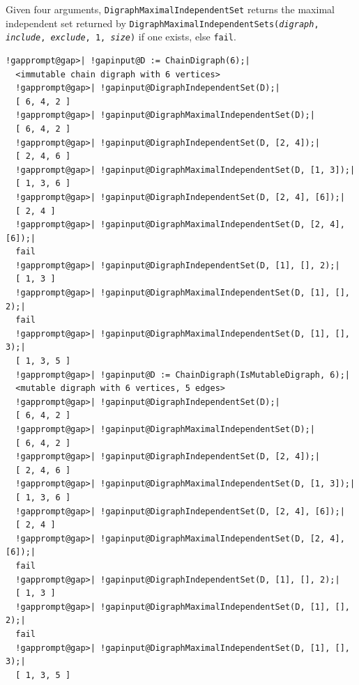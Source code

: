 \documentclass[a4paper,11pt]{report}
\begin{document}
{{{\begin{description}
 Given four arguments, \texttt{DigraphMaximalIndependentSet} returns the maximal independent set returned by \texttt{DigraphMaximalIndependentSets(}\mbox{\texttt{\mdseries\slshape digraph}}\texttt{, }\mbox{\texttt{\mdseries\slshape include}}\texttt{, }\mbox{\texttt{\mdseries\slshape exclude}}\texttt{, 1, }\mbox{\texttt{\mdseries\slshape size}}\texttt{)} if one exists, else \texttt{fail}. 
\end{description}
 
\begin{Verbatim}[commandchars=!@|,fontsize=\small,frame=single,label=Example]
  !gapprompt@gap>| !gapinput@D := ChainDigraph(6);|
  <immutable chain digraph with 6 vertices>
  !gapprompt@gap>| !gapinput@DigraphIndependentSet(D);|
  [ 6, 4, 2 ]
  !gapprompt@gap>| !gapinput@DigraphMaximalIndependentSet(D);|
  [ 6, 4, 2 ]
  !gapprompt@gap>| !gapinput@DigraphIndependentSet(D, [2, 4]);|
  [ 2, 4, 6 ]
  !gapprompt@gap>| !gapinput@DigraphMaximalIndependentSet(D, [1, 3]);|
  [ 1, 3, 6 ]
  !gapprompt@gap>| !gapinput@DigraphIndependentSet(D, [2, 4], [6]);|
  [ 2, 4 ]
  !gapprompt@gap>| !gapinput@DigraphMaximalIndependentSet(D, [2, 4], [6]);|
  fail
  !gapprompt@gap>| !gapinput@DigraphIndependentSet(D, [1], [], 2);|
  [ 1, 3 ]
  !gapprompt@gap>| !gapinput@DigraphMaximalIndependentSet(D, [1], [], 2);|
  fail
  !gapprompt@gap>| !gapinput@DigraphMaximalIndependentSet(D, [1], [], 3);|
  [ 1, 3, 5 ]
  !gapprompt@gap>| !gapinput@D := ChainDigraph(IsMutableDigraph, 6);|
  <mutable digraph with 6 vertices, 5 edges>
  !gapprompt@gap>| !gapinput@DigraphIndependentSet(D);|
  [ 6, 4, 2 ]
  !gapprompt@gap>| !gapinput@DigraphMaximalIndependentSet(D);|
  [ 6, 4, 2 ]
  !gapprompt@gap>| !gapinput@DigraphIndependentSet(D, [2, 4]);|
  [ 2, 4, 6 ]
  !gapprompt@gap>| !gapinput@DigraphMaximalIndependentSet(D, [1, 3]);|
  [ 1, 3, 6 ]
  !gapprompt@gap>| !gapinput@DigraphIndependentSet(D, [2, 4], [6]);|
  [ 2, 4 ]
  !gapprompt@gap>| !gapinput@DigraphMaximalIndependentSet(D, [2, 4], [6]);|
  fail
  !gapprompt@gap>| !gapinput@DigraphIndependentSet(D, [1], [], 2);|
  [ 1, 3 ]
  !gapprompt@gap>| !gapinput@DigraphMaximalIndependentSet(D, [1], [], 2);|
  fail
  !gapprompt@gap>| !gapinput@DigraphMaximalIndependentSet(D, [1], [], 3);|
  [ 1, 3, 5 ]
\end{Verbatim}
 }

 

}}
\end{document}
